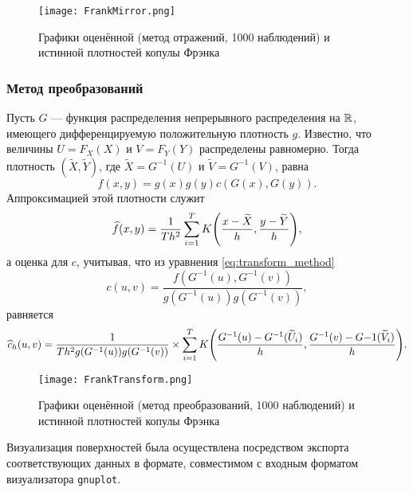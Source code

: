 \begin{figure}[h]
  \centering
  \texttt{[image: FrankMirror.png]}
  \caption{Графики оценённой (метод отражений, 1000 наблюдений) и истинной плотностей копулы Фрэнка}
\end{figure}

\subsubsection*{Метод преобразований}

Пусть $G$ --- функция распределения непрерывного распределения на $\mathbb{R}$, имеющего дифференцируемую положительную плотность $g$. Известно, что величины $U = F_X(X)$ и $V = F_Y(Y)$ распределены равномерно. Тогда плотность $(\widetilde{X}, \widetilde{Y})$, где $\widetilde{X} = G^{-1}(U)$ и $\widetilde{V} = G^{-1}(V)$, равна
\begin{equation}\label{eq:transform_method}
f(x, y) = g(x)g(y)c(G(x), G(y)).
\end{equation}
Аппроксимацией этой плотности служит
\begin{equation}
\widehat{f}(x, y) = \frac{1}{T h^2} \sum_{i=1}^T K\brts*{\frac{x - \widetilde{X}}{h}, \frac{y - \widetilde{Y}}{h}},
\end{equation}
а оценка для $c$, учитывая, что из уравнения \eqref{eq:transform_method}
\begin{equation}
c(u, v) = \frac{f(G^{-1}(u), G^{-1}(v))}{g(G^{-1}(u))g(G^{-1}(v))},
\end{equation}
равняется
\begin{equation}
  \widehat{c}_h(u, v) = \frac{1}{T h^2 g(G^{-1}(u))g(G^{-1}(v))} \times \sum_{i=1}^T K\brts*{\frac{G^{-1}(u) - G^{-1}(\widetilde{U}_i)}{h}, \frac{G^{-1}(v) - G{-1}(\widetilde{V}_i)}{h}}.
\end{equation}

\begin{figure}[h]
  \centering
  \texttt{[image: FrankTransform.png]}
  \caption{Графики оценённой (метод преобразований, 1000 наблюдений) и истинной плотностей копулы Фрэнка}
\end{figure}

Визуализация поверхностей была осуществлена посредством экспорта соответствующих данных в формате, совместимом с входным форматом визуализатора \texttt{gnuplot}.

\clearpage

